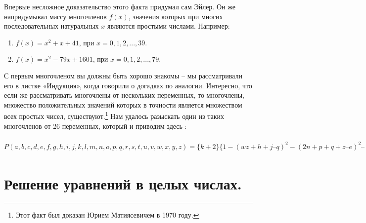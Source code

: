 \begin{center}
\end{center}

Впервые несложное доказательство этого факта придумал сам Эйлер. Он же напридумывал массу многочленов $f(x)$, значения которых при многих последовательных натуральных $x$ являются простыми числами. Например:

\begin{enumerate}[noitemsep, label=\asbuk*), ref=\asbuk*]
    \item $f(x) = x^2 + x + 41$, при $x = 0, 1, 2, ..., 39$.
    \item $f(x) = x^2 - 79x + 1601$, при $x = 0, 1, 2, ..., 79$.
\end{enumerate}

С первым многочленом вы должны быть хорошо знакомы -- мы рассматривали его в листке «Индукция», когда говорили о догадках по аналогии. Интересно, что если же рассматривать многочлены от нескольких переменных, то многочлены, множество положительных значений которых в точности является множеством всех простых чисел, существуют.\footnote{Этот факт был доказан Юрием Матиясевичем в 1970 году.} Нам удалось разыскать один из таких многочленов от 26 переменных, который и приводим здесь \smiley:

\begin{center}
$P(a, b, c, d, e, f, g, h, i, j, k, l, m, n, o, p, q, r, s, t, u, v, w, x, y, z) = \{k + 2\}\{1 - (wz + h + j – q)^2 - (2n + p + q + z – e)^2 – (a^2y^2 – y^2 + 1 – x^2)^2 – (\{e^4 + 2e^3\}\{a + 1\}^2 – o^2)^2 – (16\{k + 1\}^3\{k + 2\}\{n + 1\}^2 + 1 – f^2)^2 – (\{(a + u^4 – u^2a)^2 – 1\}\{n + 4dy\}^2 + 1 – \{x + cu\}^2)^2 – (ai + k + 1 – l – i)^2 – (\{gk + 2g + k + 1\}\{h + j\} + h – z)^2 – (16r^2y^4\{a^2 – 1\} + 1 - u^2)^2 – (p – m + l\{a – n – 1\} + b\{2an + 2a – n^2 – 2n – 2\})^2 – (z - pm + pla – p^2l + t\{2ap – p^2 – 1\})^2 – (q – x + y\{a – p – 1\} + s\{2ap + 2a – p^2 – 2p – 2\})^2 – (a^2l^2 – l^2 + 1 – m^2)^2 – (n + l + v – y)^2\}$
\end{center}

\section{Решение уравнений в целых числах.}

